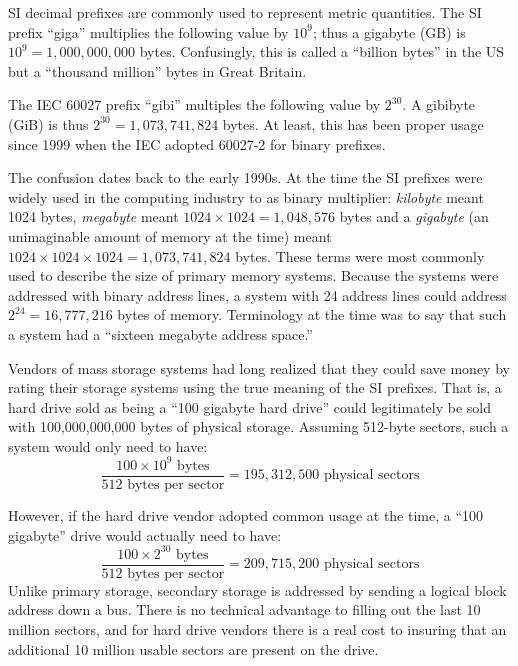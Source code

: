 SI decimal prefixes are commonly used to represent metric
quantities. The SI prefix ``giga'' multiplies the following value by $10^9$; thus a gigabyte (GB) is
$10^9=1,000,000,000$ bytes. Confusingly, this is called a ``billion
bytes'' in the US but a ``thousand million'' bytes in Great Britain.

The IEC 60027 prefix ``gibi'' multiples the following value by $2^{30}$. A gibibyte
(GiB) is thus $2^{30}=1,073,741,824$ bytes. At least, this has been
proper usage since 1999 when the IEC adopted 60027-2 for binary
prefixes. 

The confusion dates back to the early 1990s. At the time the SI
prefixes were widely used in the computing industry to as binary
multiplier: \emph{kilobyte} meant 1024 bytes, \emph{megabyte} meant
$1024\times1024=1,048,576$ bytes and a \emph{gigabyte} (an
unimaginable amount of memory at the time) meant
$1024\times1024\times1024=1,073,741,824$ bytes. These terms were most
commonly used to describe the size of primary memory systems. Because
the systems were addressed with binary address lines, a system with 24
address lines could address $2^{24}=16,777,216$ bytes of
memory. Terminology at the time was to say that such a system had a
``sixteen megabyte address space.''

Vendors of mass storage systems had long realized that they could
save money by rating their storage systems using the true meaning of
the SI prefixes. That is, a hard drive sold as being a ``100 gigabyte
hard drive'' could legitimately be sold with 100,000,000,000 bytes of
physical storage. Assuming 512-byte sectors, such a system would only
need to have:
\begin{equation}
\frac{100 \times 10^9 \textrm{~bytes}}{512 \textrm{~bytes per sector}}=195,312,500 \textrm{~physical sectors}
\end{equation}

However, if the hard drive vendor adopted common usage at the time, a
``100 gigabyte'' drive would actually need to have:
\begin{equation}
\frac{100 \times 2^{30} \textrm{~bytes}}{512 \textrm{~bytes per sector}}=209,715,200 \textrm{~physical sectors}
\end{equation}
Unlike primary storage, secondary storage is addressed by sending a
logical block address down a bus. There is no technical advantage to
filling out the last 10 million sectors, and for hard drive vendors
there is a real cost to insuring that an additional 10 million usable
sectors are present on the drive. 


